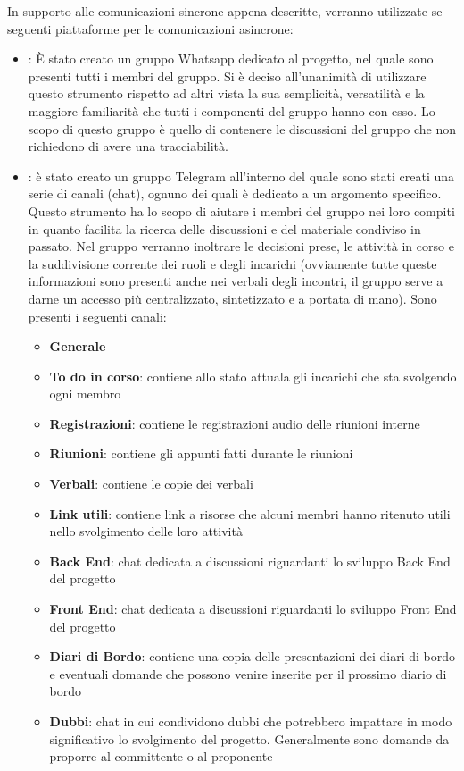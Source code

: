 \documentclass[a4paper,12pt]{article}
\begin{document}
In supporto alle comunicazioni sincrone appena descritte, verranno utilizzate se seguenti piattaforme per le comunicazioni asincrone:
\begin{itemize}
    \item \textbf{\underline{}}: È stato creato un gruppo Whatsapp dedicato al progetto, nel quale sono presenti tutti i membri del gruppo. Si è deciso all'unanimità di utilizzare questo strumento rispetto ad altri vista la sua semplicità, versatilità e la maggiore familiarità che tutti i componenti del gruppo hanno con esso. Lo scopo di questo gruppo è quello di contenere le discussioni del gruppo che non richiedono di avere una tracciabilità.
    \item \textbf{\underline{}}: è stato creato un gruppo Telegram all'interno del quale sono stati creati una serie di canali (chat), ognuno dei quali è dedicato a un argomento specifico. Questo strumento ha lo scopo di aiutare i membri del gruppo nei loro compiti in quanto facilita la ricerca delle discussioni e del materiale condiviso in passato. Nel gruppo verranno inoltrare le decisioni prese, le attività in corso e la suddivisione corrente dei ruoli e degli incarichi (ovviamente tutte queste informazioni sono presenti anche nei verbali degli incontri, il gruppo serve a darne un accesso più centralizzato, sintetizzato e a portata di mano).
        Sono presenti i seguenti canali:
        \begin{itemize} \label{sec:canaliTelegram}
            \item \textbf{Generale}
            \item \textbf{To do in corso}: contiene allo stato attuala gli incarichi che sta svolgendo ogni membro
            \item \textbf{Registrazioni}: contiene le registrazioni audio delle riunioni interne
            \item \textbf{Riunioni}: contiene gli appunti fatti durante le riunioni
            \item \textbf{Verbali}: contiene le copie dei verbali
            \item \textbf{Link utili}: contiene link a risorse che alcuni membri hanno ritenuto utili nello svolgimento delle loro attività
            \item \textbf{Back End}: chat dedicata a discussioni riguardanti lo sviluppo Back End del progetto
            \item \textbf{Front End}: chat dedicata a discussioni riguardanti lo sviluppo Front End del progetto
            \item \textbf{Diari di Bordo}: contiene una copia delle presentazioni dei diari di bordo e eventuali domande che possono venire inserite per il prossimo diario di bordo
            \item \textbf{Dubbi}: chat in cui condividono dubbi che potrebbero impattare in modo significativo lo svolgimento del progetto. Generalmente sono domande da proporre al committente o al proponente

        \end{itemize}
\end{itemize}
\end{document}

